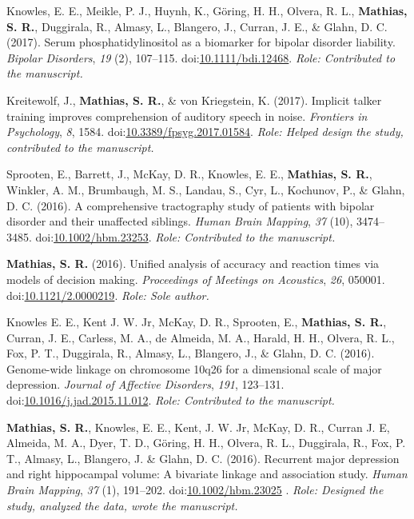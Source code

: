 \documentclass[10pt]{article}
\makeatletter
\newlength{\bibhang}
\newlength{\bibsep}
 {\@listi \global\bibsep\itemsep \global\advance\bibsep by\parsep}
\newenvironment{bibsection}%
        {\vspace{-\baselineskip}\begin{list}{}{%
       \setlength{\leftmargin}{\bibhang}%
       \setlength{\itemindent}{-\leftmargin}%
       \setlength{\itemsep}{\bibsep}%
       \setlength{\parsep}{\z@}%
        \setlength{\partopsep}{0pt}%
        \setlength{\topsep}{0pt}}}
        {\end{list}\vspace{-.6\baselineskip}}
\newcommand\doilink[1]{\href{http://dx.doi.org/#1}{#1}}
\newcommand\doi[1]{doi:\doilink{#1}}
\makeatother
\begin{document}
\begin{bibsection}
\item Knowles, E. E., Meikle, P. J., Huynh, K., Göring, H. H., Olvera, R. L., \textbf{Mathias, S. R.}, Duggirala, R., Almasy, L., Blangero, J., Curran, J. E., \& Glahn, D. C. (2017). Serum phosphatidylinositol as a biomarker for bipolar disorder liability. \emph{Bipolar Disorders}, \emph{19} (2), 107--115. \doi{10.1111/bdi.12468}. \emph{Role: Contributed to the manuscript.}

\item Kreitewolf, J., \textbf{Mathias, S. R.}, \& von Kriegstein, K. (2017). Implicit talker training improves comprehension of auditory speech in noise. \emph{Frontiers in Psychology}, \emph{8}, 1584. \doi{10.3389/fpsyg.2017.01584}.  \emph{Role: Helped design the study, contributed to the manuscript.}

\item Sprooten, E., Barrett, J., McKay, D. R., Knowles, E. E., \textbf{Mathias, S. R.}, Winkler, A. M., Brumbaugh, M. S., Landau, S., Cyr, L., Kochunov, P., \& Glahn, D. C. (2016). A comprehensive tractography study of patients with bipolar disorder and their unaffected siblings. \emph{Human Brain Mapping}, \emph{37} (10), 3474--3485. \doi{10.1002/hbm.23253}. \emph{Role: Contributed to the manuscript.}

\item \textbf{Mathias, S. R.} (2016). Unified analysis of accuracy and reaction times via models of decision making. \emph{Proceedings of Meetings on Acoustics}, \emph{26}, 050001. \doi{10.1121/2.0000219}. \emph{Role: Sole author.}

\item Knowles E. E., Kent J. W. Jr, McKay, D. R., Sprooten, E., \textbf{Mathias, S. R.}, Curran, J. E., Carless, M. A., de Almeida, M. A., Harald, H. H., Olvera, R. L., Fox, P. T., Duggirala, R., Almasy, L., Blangero, J., \& Glahn, D. C. (2016). Genome-wide linkage on chromosome 10q26 for a dimensional scale of major depression. \emph{Journal of Affective Disorders}, \emph{191}, 123--131. \doi{10.1016/j.jad.2015.11.012}. \emph{Role: Contributed to the manuscript.}

\item \textbf{Mathias, S. R.}, Knowles, E. E., Kent, J. W. Jr, McKay,  D. R., Curran J. E, Almeida, M. A., Dyer, T. D., G\"oring, H. H., Olvera, R. L., Duggirala, R., Fox, P. T., Almasy, L., Blangero, J. \& Glahn, D. C. (2016). Recurrent major depression and right hippocampal volume: A bivariate linkage and association study. \emph{Human Brain Mapping}, \emph{37} (1), 191--202. \doi{10.1002/hbm.23025} . \emph{Role: Designed the study, analyzed the data, wrote the manuscript.}


\end{bibsection}
\end{document}
